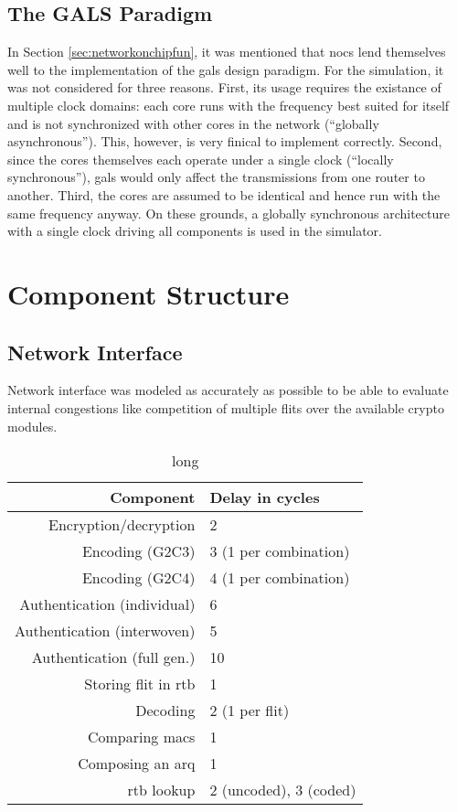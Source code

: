 \subsection{The GALS Paradigm}
In Section \ref{sec:networkonchipfun}, it was mentioned that \glspl{noc} lend themselves well to the implementation of the \gls{gals} design paradigm.
For the simulation, it was not considered for three reasons. First, its usage requires the existance of multiple clock domains: each core runs with the
frequency best suited for itself and is not synchronized with other cores in the network (\enquote{globally asynchronous}). This, however, is very
finical to implement correctly. Second, since the cores themselves each operate under a single clock (\enquote{locally synchronous}), \gls{gals} would
only affect the transmissions from one router to another. Third, the cores are assumed to be identical and hence run with the same frequency anyway.
On these grounds, a globally synchronous architecture with a single clock driving all components is used in the simulator.

\section{Component Structure}\label{sec:componentstructure}
\subsection{Network Interface}
Network interface was modeled as accurately as possible to be able to evaluate internal congestions like competition of multiple flits over the
available crypto modules.

\begin{table}
    \centering
    \begin{tabulary}{\textwidth}{R|L}
        Component & Delay in cycles \\\hline
        Encryption/decryption & 2 \\
        Encoding (G2C3) & 3 (1 per combination) \\
        Encoding (G2C4) & 4 (1 per combination) \\
        Authentication (individual) & 6 \\
        Authentication (interwoven) & 5 \\
        Authentication (full gen.) & 10 \\
        Storing flit in \gls{rtb} & 1 \\
        Decoding & 2 (1 per flit) \\
        Comparing \glspl{mac} & 1 \\
        Composing an \gls{arq} & 1 \\
        \Gls{rtb} lookup & 2 (uncoded), 3 (coded)
    \end{tabulary}
    \caption[short]{long}
    \label{tab:processinglatencies}
\end{table}

